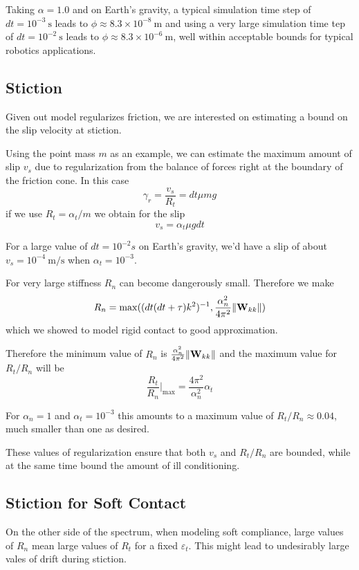 Taking $\alpha=1.0$ and on Earth's gravity, a typical simulation time step of
$dt=10^{-3}~\text{s}$ leads to $\phi\approx 8.3\times 10^{-8}~\text{m}$ and
using a very large simulation time tep of $dt=10^{-2}~\text{s}$ leads to
$\phi\approx 8.3\times 10^{-6}~\text{m}$, well within acceptable bounds for
typical robotics applications.

\subsection{Stiction}
Given out model regularizes friction, we are interested on estimating a bound on
the slip velocity at stiction. 

Using the point mass $m$ as an example, we can estimate the maximum amount of
slip $v_s$ due to regularization from the balance of forces right at the
boundary of the friction cone. In this case
\begin{equation}
    \gamma_r = \frac{v_s}{R_t} = dt\mu m g
\end{equation}
if we use $R_t=\alpha_t/m$ we obtain for the slip
\begin{equation}
    v_s = \alpha_t \mu g dt
\end{equation}

For a large value of $dt=10^{-2} s$ on Earth's gravity, we'd have a slip of
about $v_s=10^{-4}~\text{m}/\text{s}$ when $\alpha_t=10^{-3}$.

For very large stiffness $R_n$ can become dangerously small. Therefore we make
\begin{equation}
    R_n = \max( (dt(dt+\tau)k^2)^{-1}, \frac{\alpha_n^2}{4\pi^2}\Vert{\mathbf{W}}_{kk}\Vert)
\end{equation}
which we showed to model rigid contact to good approximation.

Therefore the minimum value of $R_n$ is
$\frac{\alpha_n^2}{4\pi^2}\Vert{\mathbf{W}}_{kk}\Vert$ and the maximum value for
$R_t/R_n$ will be
\begin{equation}
    \frac{R_t}{R_n}\Bigr|_\text{max} = \frac{4\pi^2}{\alpha_n^2}\alpha_t
\end{equation}

For $\alpha_n=1$ and $\alpha_t=10^{-3}$ this amounts to a maximum value of
$R_t/R_n\approx 0.04$, much smaller than one as desired.

These values of regularization ensure that both $v_s$ and $R_t/R_n$ are bounded,
while at the same time bound the amount of ill conditioning. 

\subsection{Stiction for Soft Contact}

On the other side of the spectrum, when modeling soft
compliance, large values of $R_n$ mean large values of $R_t$ for a fixed
$\varepsilon_t$. This might lead to undesirably large vales of drift during
stiction.
